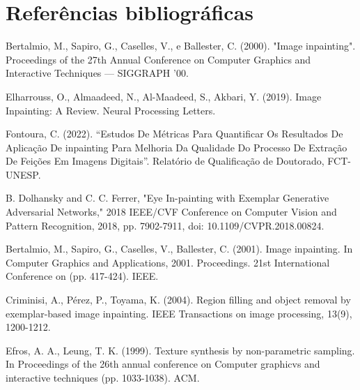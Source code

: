 \section{Referências bibliográficas}
\begin{thebibliography}{99}
	
Bertalmio, M., Sapiro, G., Caselles, V., e Ballester, C. (2000). "Image inpainting". Proceedings of the 27th Annual Conference on Computer Graphics and Interactive Techniques — SIGGRAPH ’00.

Elharrouss, O., Almaadeed, N., Al-Maadeed, S., Akbari, Y. (2019). Image Inpainting: A Review. Neural Processing Letters.

Fontoura, C. (2022). “Estudos De Métricas Para Quantificar Os Resultados De Aplicação De inpainting Para Melhoria Da Qualidade Do Processo De Extração De Feições Em Imagens Digitais”. Relatório de Qualificação de Doutorado, FCT-UNESP.

B. Dolhansky and C. C. Ferrer, "Eye In-painting with Exemplar Generative Adversarial Networks," 2018 IEEE/CVF Conference on Computer Vision and Pattern Recognition, 2018, pp. 7902-7911, doi: 10.1109/CVPR.2018.00824.

Bertalmio, M., Sapiro, G., Caselles, V.,  Ballester, C. (2001). Image inpainting. In Computer Graphics and Applications, 2001. Proceedings. 21st International Conference on (pp. 417-424). IEEE.

Criminisi, A., Pérez, P., Toyama, K. (2004). Region filling and object removal by exemplar-based image inpainting. IEEE Transactions on image processing, 13(9), 1200-1212.

Efros, A. A., Leung, T. K. (1999). Texture synthesis by non-parametric sampling. In Proceedings of the 26th annual conference on Computer graphicvs and interactive techniques (pp. 1033-1038). ACM.


\end{thebibliography}

